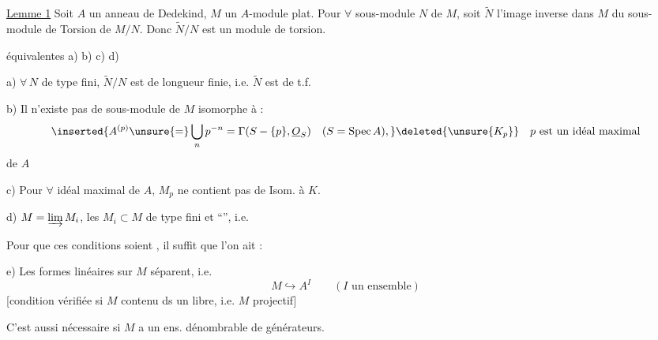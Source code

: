 \deleted{\[f(gh)=\sum f_i(g)\varphi_i(h),\]}

\uline{Lemme 1} Soit $A$ un anneau de Dedekind, $M$ un $A$-module plat.  Pour $\forall$ sous-module $N$ de $M$, soit $\tilde N$ l'image inverse dans $M$ du sous-module de Torsion de $M/N$. Donc $\tilde N/N$ est un module de torsion.

 équivalentes a) b) c) d)

a) $\forall\,N$ de type fini, $\tilde N/N$ est de longueur finie, i.e. $\tilde N$ est de t.f.

b)  Il n'existe pas de sous-module de $M$ isomorphe à :
\[
\inserted{A^{(p)}\unsure{=}\bigcup_n p^{-n}=\Gamma(S-\{p\},\underline O_S)\quad(S=\operatorname{Spec}A),}
\deleted{\unsure{K_p}}\quad p\text{ est un idéal maximal}
\]
de $A$ 

c)  Pour $\forall$ idéal maximal  de $A$, $M_p$ ne contient pas de  Isom. à $K$.

d) $M=\varinjlim M_i$, les $M_i\subset M$ de type fini et ``'', i.e. 

Pour que ces conditions soient , il suffit que l'on ait :

e) Les formes linéaires sur $M$ séparent, i.e.
\[
M\hookrightarrow A^I\qquad(I\text{ un ensemble})
\]
[condition vérifiée si $M$ contenu ds un libre,  i.e. $M$ projectif]

C'est aussi nécessaire si $M$ a un ens. dénombrable de générateurs.
